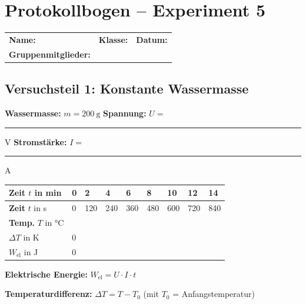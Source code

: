 \documentclass[11pt,a4paper]{scrartcl}
\begin{document}
	\newpage
	\section*{Protokollbogen -- Experiment 5}
	
	\begin{center}
		\begin{tcolorbox}[colback=white, colframe=black, width=\textwidth, boxrule=0.5pt]
			\begin{tabular}{@{}p{0.32\textwidth}p{}p{}@{}}
				\textbf{Name:} \hrulefill & \textbf{Klasse:} \hrulefill & \textbf{Datum:} \hrulefill \\[0.4cm]
				\textbf{Gruppenmitglieder:} & \multicolumn{2}{l}{\hrulefill} \\
			\end{tabular}
		\end{tcolorbox}
	\end{center}
	
	\subsection*{Versuchsteil 1: Konstante Wassermasse}
	
	\textbf{Wassermasse:} $m = \SI{200}{\gram}$ \hfill \textbf{Spannung:} $U = $ \rule{2cm}{0.4pt} V \hfill \textbf{Stromstärke:} $I = $ \rule{2cm}{0.4pt} A
	
	\vspace{0.3cm}
	
	\begin{center}
		\renewcommand{\arraystretch}{2.2}
		\begin{tabular}{|p{2.5cm}|p{1.3cm}|p{1.3cm}|p{1.3cm}|p{1.3cm}|p{1.3cm}|p{1.3cm}|p{1.3cm}|p{1.3cm}|}
			\hline
			\textbf{Zeit} $t$ in min & 0 & 2 & 4 & 6 & 8 & 10 & 12 & 14 \\
			\hline
			\textbf{Zeit} $t$ in s & 0 & 120 & 240 & 360 & 480 & 600 & 720 & 840 \\
			\hline
			\textbf{Temp.} $T$ in °C & & & & & & & & \\
			\hline
			$\Delta T$ in K & 0 & & & & & & & \\
			\hline
			$W_{\text{el}}$ in J & 0 & & & & & & & \\
			\hline
		\end{tabular}
	\end{center}
	
	\begin{infobox}[title={\faIcon{info-circle} Berechnung}]
		\textbf{Elektrische Energie:} \quad $W_{\text{el}} = U \cdot I \cdot t$
		
		\textbf{Temperaturdifferenz:} \quad $\Delta T = T - T_0$ \quad (mit $T_0$ = Anfangstemperatur)
	\end{infobox}
	
\end{document}
